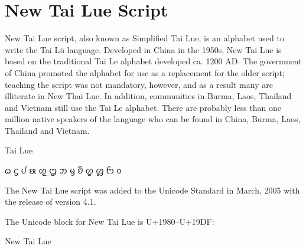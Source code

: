 \section{New Tai Lue Script}

\newfontfamily{}

New Tai Lue script, also known as Simplified Tai Lue, is an alphabet used to write the Tai Lü language. Developed in China in the 1950s, New Tai Lue is based on the traditional Tai Le alphabet developed ca. 1200 AD. The government of China promoted the alphabet for use as a replacement for the older script; teaching the script was not mandatory, however, and as a result many are illiterate in New Thai Lue. In addition, communities in Burma, Laos, Thailand and Vietnam still use the Tai Le alphabet. There are probably less than one million native speakers of the language who can be found in China, Burma, Laos, Thailand and Vietnam.

\begin{scriptexample}[]{Tai Lue}
{\centering\tailue \LARGE

ᦒ	ᦓ	ᦔ	ᦕ	ᦖ	ᦗ	ᦘ	ᦙ	ᦚ	ᦛ	ᦜ	ᦝ	ᦞ	

}
\end{scriptexample}

The New Tai Lue script was added to the Unicode Standard in March, 2005 with the release of version 4.1.

The Unicode block for New Tai Lue is U+1980–U+19DF:

\begin{scriptexample}[]{New Tai Lue}
\end{scriptexample}